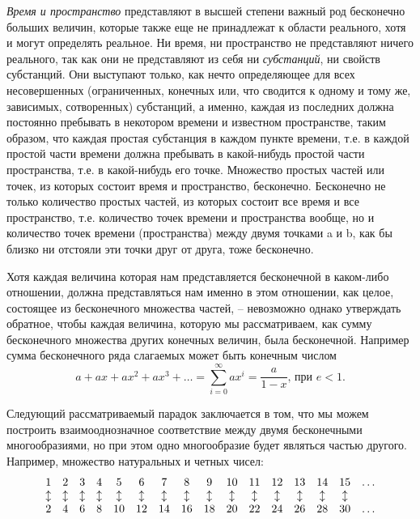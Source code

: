 \documentclass[12pt]{extarticle}
\begin{document}
\textit{Время и пространство} представляют в высшей степени важный род бесконечно больших величин, которые также еще не принадлежат к области реального, хотя и могут определять реальное. Ни время, ни пространство не представляют ничего реального, так как они не представляют из себя ни \textit{субстанций}, ни свойств субстанций. Они выступают только, как нечто определяющее для всех несовершенных (ограниченных,
конечных или, что сводится к одному и тому же, зависимых, сотворенных)
субстанций, а именно, каждая из последних должна постоянно пребывать в некотором времени и известном пространстве, таким образом, что каждая простая субстанция в каждом пункте времени, т.е. в каждой простой части времени должна пребывать в какой-нибудь простой части пространства, т.е. в какой-нибудь его точке. Множество простых частей или точек, из которых состоит время и пространство, бесконечно. Бесконечно не только количество простых частей, из которых состоит все время и все пространство, т.е. количество точек времени и пространства вообще, но и количество точек времени (пространства) между двумя точками a и b, как бы близко ни отстояли эти точки друг от друга, тоже бесконечно.

Хотя каждая величина которая нам представляется бесконечной в каком-либо отношении, должна представляться нам именно в этом отношении, как целое, состоящее из бесконечного множества частей, – невозможно однако утверждать обратное, чтобы каждая величина, которую мы рассматриваем, как сумму бесконечного множества других конечных величин, была бесконечной. Например сумма бесконечного ряда слагаемых может быть конечным числом
$$
a + ax + ax^2 + ax^3 + \ldots = \sum_{i = 0}^{\infty} ax^i = \frac{a}{1-x} \mbox{, при } e < 1.
$$

Следующий рассматриваемый парадок заключается в том, что мы можем построить взаимооднозначное соответствие между двумя бесконечными многообразиями, но при этом одно многообразие будет являться частью другого. Например, множество натуральных и четных чисел:
$$
\begin{array}{c c c c c c c c c c c c c c c c}
1 & 2 & 3 & 4 & 5 & 6 & 7 & 8 & 9 & 10 & 11 & 12 & 13 & 14 & 15 & \ldots \\
\updownarrow &
\updownarrow &
\updownarrow &
\updownarrow &
\updownarrow &
\updownarrow &
\updownarrow & 
\updownarrow &
\updownarrow &
\updownarrow &
\updownarrow &
\updownarrow &
\updownarrow &
\updownarrow &
\updownarrow & \\
2 & 4 & 6 & 8 & 10 & 12 & 14 & 16 & 18 & 20 & 22 & 24 & 26 & 28 & 30 & \ldots
\end{array}
$$
\end{document}
